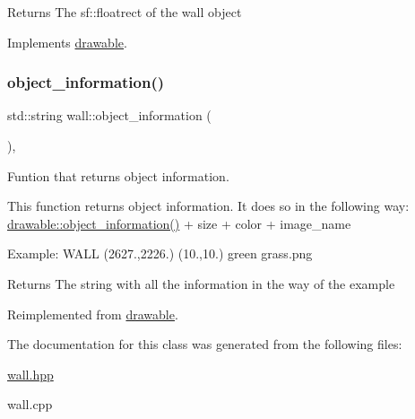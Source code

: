 \begin{DoxyReturn}{Returns}
The sf\+::floatrect of the wall object 
\end{DoxyReturn}


Implements \hyperlink{classdrawable_ae013ac0be47538be9ce885d6642daf73}{drawable}.

\mbox{\label{classwall_aab1de4f144f176b134a967ba08747932}} 
\subsubsection{\texorpdfstring{object\+\_\+information()}{object\_information()}}
{\footnotesize\ttfamily std\+::string wall\+::object\+\_\+information (\begin{DoxyParamCaption}{ }\end{DoxyParamCaption})\hspace{0.3cm}{\ttfamily [override]}, {\ttfamily [virtual]}}



Funtion that returns object information. 

This function returns object information. It does so in the following way\+: \hyperlink{classdrawable_a2ed0f8bb53f33477f7722efa7bb24583}{drawable\+::object\+\_\+information()} + size + color + image\+\_\+name

Example\+: W\+A\+LL (2627.,2226.) (10.,10.) green grass.\+png

\begin{DoxyReturn}{Returns}
The string with all the information in the way of the example 
\end{DoxyReturn}


Reimplemented from \hyperlink{classdrawable_a2ed0f8bb53f33477f7722efa7bb24583}{drawable}.



The documentation for this class was generated from the following files\+:\begin{DoxyCompactItemize}
\item 
\hyperlink{wall_8hpp}{wall.\+hpp}\item 
wall.\+cpp\end{DoxyCompactItemize}
